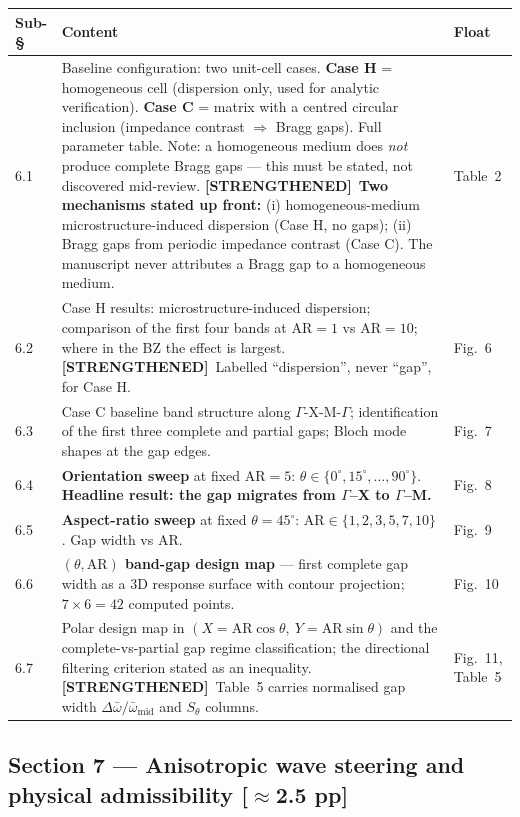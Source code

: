 \documentclass[11pt,a4paper]{article}
\newcommand{\bp}[1]{\textcolor{accent}{\textsf{\footnotesize [#1]}}}
\newcommand{\STR}{{\color{strcol}\textbf{[STRENGTHENED]}}}
\begin{document}
\begin{tabularx}{\textwidth}{@{}L{1.5cm} Y L{3.4cm}@{}}
\toprule
Sub-\S & Content & Float \\
 & Baseline configuration: two unit-cell cases. \textbf{Case H} = homogeneous cell (dispersion only, used for analytic verification). \textbf{Case C} = matrix with a centred circular inclusion (impedance contrast $\Rightarrow$ Bragg gaps). Full parameter table. \textcolor{warn}{Note: a homogeneous medium does \emph{not} produce complete Bragg gaps --- this must be stated, not discovered mid-review.} \STR\ \textbf{Two mechanisms stated up front:} (i) homogeneous-medium microstructure-induced dispersion (Case H, no gaps); (ii) Bragg gaps from periodic impedance contrast (Case C). The manuscript never attributes a Bragg gap to a homogeneous medium. & Table~2 \\
6.2 & Case H results: microstructure-induced dispersion; comparison of the first four bands at $\mathrm{AR}=1$ vs $\mathrm{AR}=10$; where in the BZ the effect is largest. \STR\ Labelled ``dispersion'', never ``gap'', for Case H. & Fig.~6 \\
6.3 & Case C baseline band structure along $\Gamma$-X-M-$\Gamma$; identification of the first three complete and partial gaps; Bloch mode shapes at the gap edges. & Fig.~7 \\
6.4 & \textbf{Orientation sweep} at fixed $\mathrm{AR}=5$: $\theta\in\{0^\circ,15^\circ,\ldots,90^\circ\}$. \textbf{Headline result: the gap migrates from $\Gamma$--X to $\Gamma$--M.} & Fig.~8 \\
6.5 & \textbf{Aspect-ratio sweep} at fixed $\theta=45^\circ$: $\mathrm{AR}\in\{1,2,3,5,7,10\}$. Gap width vs $\mathrm{AR}$. & Fig.~9 \\
6.6 & \textbf{$(\theta,\mathrm{AR})$ band-gap design map} --- first complete gap width as a 3D response surface with contour projection; $7\times6=42$ computed points. & Fig.~10 \\
6.7 & Polar design map in $(X=\mathrm{AR}\cos\theta,\ Y=\mathrm{AR}\sin\theta)$ and the complete-vs-partial gap regime classification; the directional filtering criterion stated as an inequality. \STR\ Table~5 carries normalised gap width $\Delta\bar\omega/\bar\omega_{\mathrm{mid}}$ and $S_\theta$ columns. & Fig.~11, Table~5 \\
\bottomrule
\end{tabularx}

\subsection{Section 7 --- Anisotropic wave steering and physical admissibility \bp{$\approx$2.5 pp}}
\end{document}
